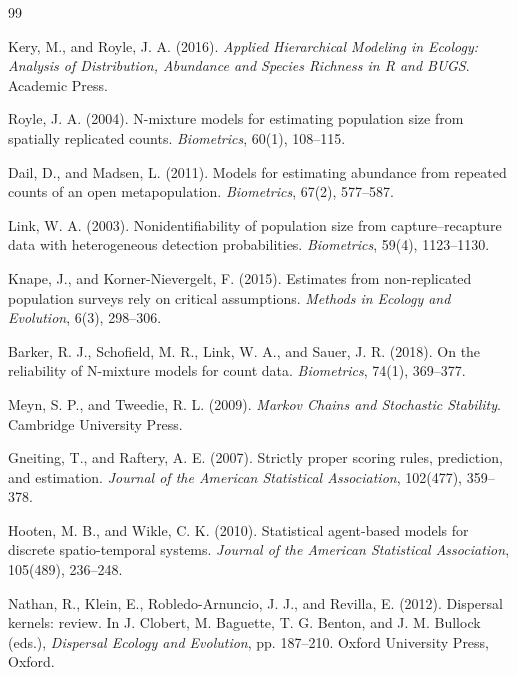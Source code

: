 \documentclass[preprint,12pt]{elsarticle}
\theoremstyle{definition}
\begin{document}
\begin{thebibliography}{99}

Kery, M., and Royle, J. A. (2016).
\newblock \emph{Applied Hierarchical Modeling in Ecology: Analysis of Distribution, Abundance and Species Richness in R and BUGS}.
\newblock Academic Press.

Royle, J. A. (2004).
\newblock N-mixture models for estimating population size from spatially replicated counts.
\newblock \emph{Biometrics}, 60(1), 108--115.

Dail, D., and Madsen, L. (2011).
\newblock Models for estimating abundance from repeated counts of an open metapopulation.
\newblock \emph{Biometrics}, 67(2), 577--587.

Link, W. A. (2003).
\newblock Nonidentifiability of population size from capture--recapture data with heterogeneous detection probabilities.
\newblock \emph{Biometrics}, 59(4), 1123--1130.

Knape, J., and Korner-Nievergelt, F. (2015).
\newblock Estimates from non-replicated population surveys rely on critical assumptions.
\newblock \emph{Methods in Ecology and Evolution}, 6(3), 298--306.

Barker, R. J., Schofield, M. R., Link, W. A., and Sauer, J. R. (2018).
\newblock On the reliability of N-mixture models for count data.
\newblock \emph{Biometrics}, 74(1), 369--377.

Meyn, S. P., and Tweedie, R. L. (2009).
\newblock \emph{Markov Chains and Stochastic Stability}.
\newblock Cambridge University Press.

Gneiting, T., and Raftery, A. E. (2007).
\newblock Strictly proper scoring rules, prediction, and estimation.
\newblock \emph{Journal of the American Statistical Association}, 102(477), 359--378.

Hooten, M. B., and Wikle, C. K. (2010).
\newblock Statistical agent-based models for discrete spatio-temporal systems.
\newblock \emph{Journal of the American Statistical Association}, 105(489), 236--248.

Nathan, R., Klein, E., Robledo-Arnuncio, J. J., and Revilla, E. (2012).
\newblock Dispersal kernels: review.
\newblock In J. Clobert, M. Baguette, T. G. Benton, and J. M. Bullock (eds.), \emph{Dispersal Ecology and Evolution}, pp. 187--210. Oxford University Press, Oxford.


\end{thebibliography}
\end{document}
